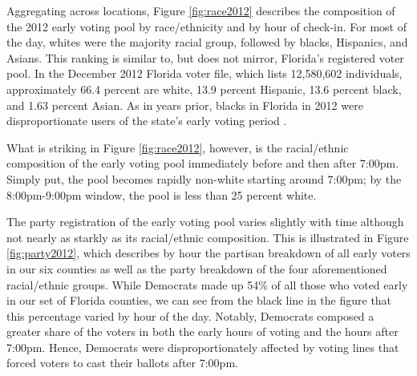 \documentclass[12pt,titlepage]{article}
\begin{document}
Aggregating across locations, Figure \ref{fig:race2012} describes the
composition of the 2012 early voting pool by race/ethnicity and by
hour of check-in.  For most of the day, whites were the majority
racial group, followed by blacks, Hispanics, and Asians.  This ranking
is similar to, but does not mirror, Florida's registered voter pool.
In the December 2012 Florida voter file, which lists 12,580,602
individuals, approximately 66.4 percent are white, 13.9 percent
Hispanic, 13.6 percent black, and 1.63 percent Asian.  As in years
prior, blacks in Florida in 2012 were disproportionate users of the
state's early voting period \citep{herronsmith:souls}.





What is striking in Figure \ref{fig:race2012}, however, is the
racial/ethnic composition of the early voting pool immediately before
and then after 7:00pm.  Simply put, the pool becomes rapidly non-white
starting around 7:00pm; by the 8:00pm-9:00pm window, the pool is less
than 25 percent white.

The party registration of the early voting pool varies slightly with
time although not nearly as starkly as its racial/ethnic composition.
This is illustrated in Figure \ref{fig:party2012}, which describes by
hour the partisan breakdown of all early voters in our six counties as
well as the party breakdown of the four aforementioned racial/ethnic
groups.  While Democrats made up 54\% of all those who voted early in
our set of Florida counties, we can see from the black line in the
figure that this percentage varied by hour of the day.  Notably,
Democrats composed a greater share of the voters in both the early
hours of voting and the hours after 7:00pm.  Hence, Democrats were
disproportionately affected by voting lines that forced voters to cast
their ballots after 7:00pm.
\end{document}

